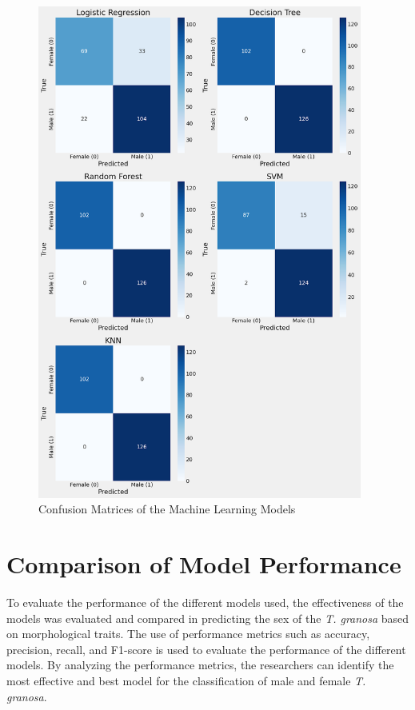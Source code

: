 \begin{figure}[!htbp]
	\centering
	\includegraphics[width=0.95\textwidth]{figures/confusion matrices.png}
	\caption{Confusion Matrices of the Machine Learning Models}
	\label{fig:confusion matrices}
\end{figure}

\section{Comparison of Model Performance}

To evaluate the performance of the different models used, the effectiveness of the models was evaluated and compared in predicting the sex of the \textit{T. granosa} based on morphological traits. The use of performance metrics such as accuracy, precision, recall, and F1-score is used to evaluate the performance of the different models. By analyzing the performance metrics, the researchers can identify the most effective and best model for the classification of male and female \textit{T. granosa}. 


